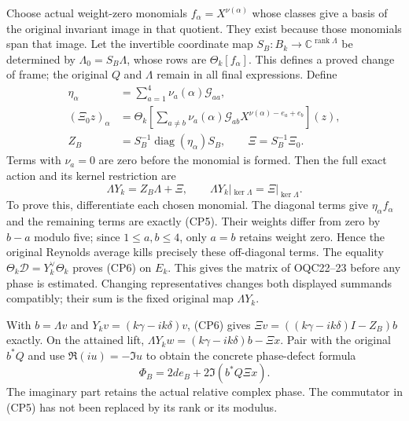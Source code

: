 \documentclass[11pt]{article}
\newcommand{\C}{\mathbb C}\newcommand{\R}{\mathbb R}
\newcommand{\rank}{\operatorname{rank}}\newcommand{\Rea}{\operatorname{Re}}
\begin{document}
Choose actual weight-zero monomials $f_\alpha=X^{\nu(\alpha)}$ whose
classes give a basis of the original invariant image in that quotient.
They exist because those monomials span that image. Let the invertible
coordinate map $S_B:B_k\to\C^{\rank\Lambda}$ be determined by
$\Lambda_0=S_B\Lambda$, whose rows are $\Theta_k[f_\alpha]$.
This defines a proved change of frame; the original $Q$ and $\Lambda$
remain in all final expressions. Define
\begin{equation}\tag{CP5}
 \begin{split}
 \eta_\alpha&=\sum_{a=1}^4\nu_a(\alpha)\mathcal G_{aa},\\
 (\Xi_0z)_\alpha&=
 \Theta_k\left[\sum_{a\ne b}\nu_a(\alpha)\mathcal G_{ab}
 X^{\nu(\alpha)-e_a+e_b}\right](z),\\
 Z_B&=S_B^{-1}\operatorname{diag}(\eta_\alpha)S_B,
 \qquad \Xi=S_B^{-1}\Xi_0.
 \end{split}
\end{equation}
Terms with $\nu_a=0$ are zero before the monomial is formed.
Then the full exact action and its kernel restriction are
\begin{equation}\tag{CP6}
 \boxed{\Lambda Y_k=Z_B\Lambda+\Xi,\qquad
             \Lambda Y_k|_{\ker\Lambda}=\Xi|_{\ker\Lambda}.}
\end{equation}
To prove this, differentiate each chosen monomial. The diagonal terms
give $\eta_\alpha f_\alpha$ and the remaining terms are exactly (CP5).
Their weights differ from zero by $b-a$ modulo five; since
$1\le a,b\le4$, only $a=b$ retains weight zero. Hence the original
Reynolds average kills precisely these off-diagonal terms. The equality
$\Theta_k\mathcal D=Y_k^\vee\Theta_k$ proves (CP6) on $E_k$.
This gives the matrix of OQC22--23 before any phase is estimated.
Changing representatives changes both displayed summands compatibly;
their sum is the fixed original map $\Lambda Y_k$.

With $b=\Lambda v$ and $Y_kv=(k\gamma-ik\delta)v$, (CP6) gives
$\Xi v=((k\gamma-ik\delta)I-Z_B)b$ exactly. On the attained lift,
$\Lambda Y_kw=(k\gamma-ik\delta)b-\Xi x$.
Pair with the original $b^*Q$ and use
$\Re(iu)=-\Im u$ to obtain the concrete phase-defect formula
\begin{equation}\tag{CP7}
 \boxed{\Phi_B=2d e_B+2\Im(b^*Q\Xi x).}
\end{equation}
The imaginary part retains the actual relative complex phase. The
commutator in (CP5) has not been replaced by its rank or its modulus.
\end{document}
